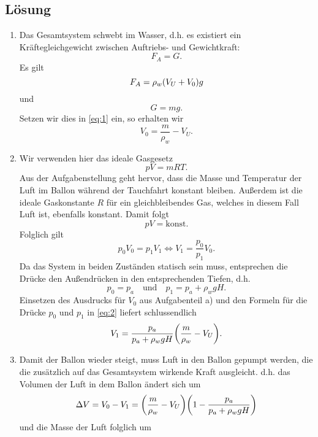 \documentclass{exercise}
\begin{document}
    \subsection*{Lösung}
    \begin{enumerate}
        \item Das Gesamtsystem schwebt im Wasser, d.h. es existiert ein Kräftegleichgewicht zwischen Auftriebs- und Gewichtkraft:
        \begin{equation}\label{eq:1}
            F_A = G.
        \end{equation}
        Es gilt
        \[
            F_A = \rho_w\parentheses*{V_U + V_0}g
        \]
        und
        \[
            G = mg.
        \]
        Setzen wir dies in \eqref{eq:1} ein, so erhalten wir
        \[
            V_0 = \frac{m}{\rho_w} - V_U.
        \]
        \item Wir verwenden hier das ideale Gasgesetz
        \[
            pV = mRT.
        \]
        Aus der Aufgabenstellung geht hervor, dass die Masse und Temperatur der Luft im Ballon während der Tauchfahrt konstant bleiben.
        Außerdem ist die ideale Gaskonstante \(R\) für ein gleichbleibendes Gas, welches in diesem Fall Luft ist, ebenfalls konstant.
        Damit folgt
        \[
            pV = \text{konst.}
        \]
        Folglich gilt
        \begin{equation}\label{eq:2}
            p_0 V_0 = p_1 V_1 \iff V_1 = \frac{p_0}{p_1}V_0.
        \end{equation}
        Da das System in beiden Zuständen statisch sein muss, entsprechen die Drücke den Außendrücken in den entsprechenden Tiefen, d.h.
        \[
            p_0 = p_a \quad \text{und} \quad p_1 = p_a + \rho_w gH.
        \]
        Einsetzen des Ausdrucks für \(V_0\) aus Aufgabenteil a) und den Formeln für die Drücke \(p_0\) und \(p_1\) in \eqref{eq:2} liefert schlussendlich
        \[
            V_1 = \frac{p_a}{p_a + \rho_w gH}\parentheses*{\frac{m}{\rho_w} - V_U}.
        \]
        \item Damit der Ballon wieder steigt, muss Luft in den Ballon gepumpt werden, die die zusätzlich auf das Gesamtsystem wirkende Kraft ausgleicht. d.h. das Volumen der Luft in dem Ballon ändert sich um
        \begin{equation}\label{eq:3}
            \Delta V = V_0 - V_1 = \parentheses*{\frac{m}{\rho_w} - V_U}\parentheses*{1 - \frac{p_a}{p_a + \rho_w gH}}
        \end{equation}
        und die Masse der Luft folglich um
        \begin{equation}\label{eq:4}

\end{equation}
\end{enumerate}
\end{document}
